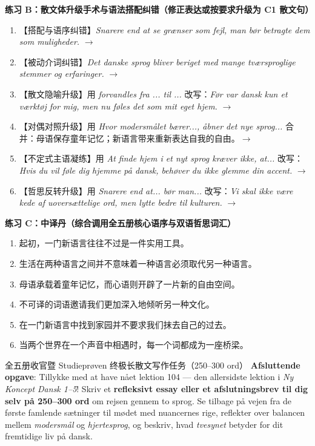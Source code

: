 \textbf{练习 B：散文体升级手术与语法搭配纠错（修正表达或按要求升级为 C1 散文句）}
\begin{enumerate}
  \item 【搭配与语序纠错】\textit{Snarere end at se grænser som fejl, man bør betragte dem som muligheder.} $\rightarrow$
  \item 【被动介词纠错】\textit{Det danske sprog bliver beriget med mange tværsproglige stemmer og erfaringer.} $\rightarrow$
  \item 【散文隐喻升级】用 \textit{forvandles fra ... til ...} 改写：\textit{Før var dansk kun et værktøj for mig, men nu føles det som mit eget hjem.} $\rightarrow$
  \item 【对偶对照升级】用 \textit{Hvor modersmålet bærer..., åbner det nye sprog...} 合并：母语保存童年记忆；新语言带来重新表达自我的自由。$\rightarrow$
  \item 【不定式主语凝练】用 \textit{At finde hjem i et nyt sprog kræver ikke, at...} 改写：\textit{Hvis du vil føle dig hjemme på dansk, behøver du ikke glemme din accent.} $\rightarrow$
  \item 【哲思反转升级】用 \textit{Snarere end at... bør man...} 改写：\textit{Vi skal ikke være kede af uoversættelige ord, men lytte bedre til kulturen.} $\rightarrow$
\end{enumerate}

\textbf{练习 C：中译丹（综合调用全五册核心语序与双语哲思词汇）}
\begin{enumerate}
  \item 起初，一门新语言往往不过是一件实用工具。
  \item 生活在两种语言之间并不意味着一种语言必须取代另一种语言。
  \item 母语承载着童年记忆，而心语则开辟了一片新的自由空间。
  \item 不可译的词语邀请我们更加深入地倾听另一种文化。
  \item 在一门新语言中找到家园并不要求我们抹去自己的过去。
  \item 当两个世界在一个声音中相遇时，每一个词都成为一座桥梁。
\end{enumerate}


\begin{emailbox}{全五册收官暨 Studieprøven 终极长散文写作任务（250--300 ord）}
\textbf{Afsluttende opgave}: Tillykke med at have nået lektion 104 --- den allersidste lektion i \textit{Ny Koncept Dansk 1--5}! Skriv et \textbf{refleksivt essay eller et afslutningsbrev til dig selv på 250--300 ord} om rejsen gennem to sprog. Se tilbage på vejen fra de første famlende sætninger til mødet med nuancernes rige, reflekter over balancen mellem \textit{modersmål} og \textit{hjertesprog}, og beskriv, hvad \textit{tvesynet} betyder for dit fremtidige liv på dansk.
\end{emailbox}

